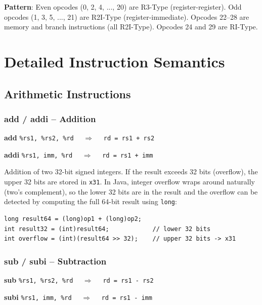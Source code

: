 \documentclass[12pt,a4paper]{article}
\begin{document}
\textbf{Pattern}: Even opcodes (0, 2, 4, ..., 20) are R3-Type (register-register). Odd opcodes (1, 3, 5, ..., 21) are R2I-Type (register-immediate). Opcodes 22--28 are memory and branch instructions (all R2I-Type). Opcodes 24 and 29 are RI-Type.

\section{Detailed Instruction Semantics}

\subsection{Arithmetic Instructions}

\subsubsection{add / addi -- Addition}

\begin{tcolorbox}[colback=blue!5, colframe=blue!50!black]
\textbf{add} \texttt{\%rs1, \%rs2, \%rd} $\quad\Rightarrow\quad$ \texttt{rd = rs1 + rs2}

\textbf{addi} \texttt{\%rs1, imm, \%rd} $\quad\Rightarrow\quad$ \texttt{rd = rs1 + imm}
\end{tcolorbox}

Addition of two 32-bit signed integers. If the result exceeds 32 bits (overflow), the upper 32 bits are stored in \texttt{x31}. In Java, integer overflow wraps around naturally (two's complement), so the lower 32 bits are in the result and the overflow can be detected by computing the full 64-bit result using \texttt{long}:

\begin{lstlisting}[style=javastyle]
long result64 = (long)op1 + (long)op2;
int result32 = (int)result64;            // lower 32 bits
int overflow = (int)(result64 >> 32);    // upper 32 bits -> x31
\end{lstlisting}

\subsubsection{sub / subi -- Subtraction}

\begin{tcolorbox}[colback=blue!5, colframe=blue!50!black]
\textbf{sub} \texttt{\%rs1, \%rs2, \%rd} $\quad\Rightarrow\quad$ \texttt{rd = rs1 - rs2}

\textbf{subi} \texttt{\%rs1, imm, \%rd} $\quad\Rightarrow\quad$ \texttt{rd = rs1 - imm}
\end{tcolorbox}
\end{document}
